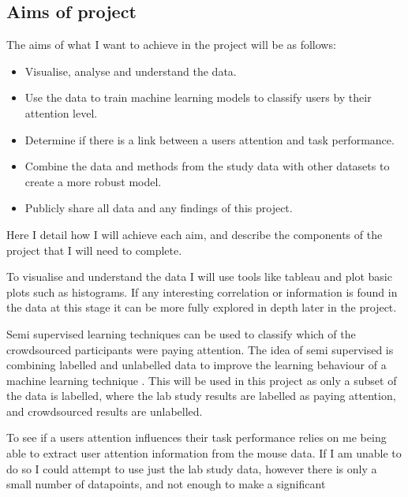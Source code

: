 \documentclass{article}
\begin{document}
\subsection{Aims of project}

The aims of what I want to achieve in the project will be as follows:
\begin{itemize}
    \item Visualise, analyse and understand the data.
    \item Use the data to train machine learning models to classify users by their attention level.
    \item Determine if there is a link between a users attention and task performance.
    \item Combine the data and methods from the study data with other datasets to create a more robust model.
    \item Publicly share all data and any findings of this project.
\end{itemize}

Here I detail how I will achieve each aim, and describe the components of the project that I will need to complete.

To visualise and understand the data I will use tools like tableau and plot basic plots such as histograms.
If any interesting correlation or information is found in the data at this stage it can be more fully explored in depth later in the project.


Semi supervised learning techniques can be used to classify which of the crowdsourced participants were paying attention.
The idea of semi supervised is combining labelled and unlabelled data to improve the learning behaviour of a machine learning technique \cite{zhu2009introduction}.
This will be used in this project as only a subset of the data is labelled, where the lab study results are labelled as paying attention, and crowdsourced results are unlabelled.

To see if a users attention influences their task performance relies on me being able to extract user attention information from the mouse data.
If I am unable to do so I could attempt to use just the lab study data, however there is only a small number of datapoints, and not enough to make a significant
\end{document}
